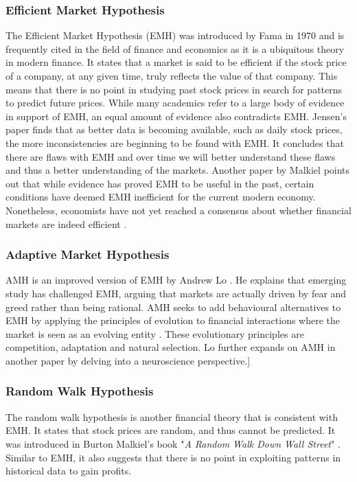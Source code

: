 \documentclass{UoYCSproject}
\begin{document}
\subsubsection{Efficient Market Hypothesis}
The Efficient Market Hypothesis (EMH) was introduced by Fama in 1970  \cite{malkiel1970efficient} and is frequently cited in the field of finance and economics as it is a ubiquitous theory in modern finance. It states that a market is said to be efficient if the stock price of a company, at any given time, truly reflects the value of that company. This means that there is no point in studying past stock prices in search for patterns to predict future prices. While many academics refer to a large body of evidence in support of EMH, an equal amount of evidence also contradicts EMH. Jensen's \cite{jensen1978some} paper finds that as better data is becoming available, such as daily stock prices, the more inconsistencies are beginning to be found with EMH. It concludes that there are flaws with EMH and over time we will better understand these flaws and thus a better understanding of the markets. Another paper by Malkiel \cite{malkiel2003efficient} points out that while evidence has proved EMH to be useful in the past, certain conditions have deemed EMH inefficient for the current modern economy. Nonetheless, economists have not yet reached a consensus about whether financial markets are indeed efficient \cite{lo2004adaptive}.  

\subsubsection{Adaptive Market Hypothesis}
AMH is an improved version of EMH by Andrew Lo \cite{lo2004adaptive}. He explains that emerging study has challenged EMH, arguing that markets are actually driven by fear and greed rather than being rational. AMH seeks to add behavioural alternatives to EMH by applying the principles of evolution to financial interactions where the market is seen as an evolving entity \cite{lo2004adaptive}. These evolutionary principles are competition, adaptation and natural selection. Lo further expands on AMH in another paper \cite{lo2005reconciling}
by delving into a neuroscience perspective.]

\subsubsection{Random Walk Hypothesis}
The random walk hypothesis is another financial theory that is consistent with EMH. It states that stock prices are random, and thus cannot be predicted. It was introduced in Burton Malkiel's book "\textit{A Random Walk Down Wall Street}" \cite{malkiel1973random}. Similar to EMH, it also suggests that there is no point in exploiting patterns in historical data to gain profits.  
\end{document}
